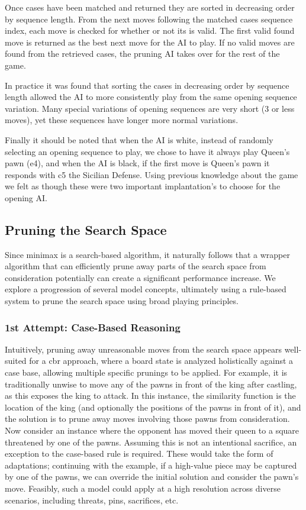 \documentclass[letterpaper]{article}
\begin{document}
Once cases have been matched and returned they are sorted in decreasing order by sequence length. From the next moves following the matched cases sequence index, each move is checked for whether or not its is valid. The first valid found move is returned as the best next move for the AI to play. If no valid moves are found from the retrieved cases, the pruning AI takes over for the rest of the game.

In practice it was found that sorting the cases in decreasing order by sequence length allowed the AI to more consistently play from the same opening sequence variation. Many special variations of opening sequences are very short (3 or less moves), yet these sequences have longer more normal variations.

Finally it should be noted that when the AI is white, instead of randomly selecting an opening sequence to play, we chose to have it always play Queen's pawn (e4), and when the AI is black, if the first move is Queen's pawn it responds with c5 the Sicilian Defense. Using previous knowledge about the game we felt as though these were two important implantation's to choose for the opening AI. 

\subsection{Pruning the Search Space}
Since minimax is a search-based algorithm, it naturally follows that a wrapper algorithm that can efficiently prune away parts of the search space from consideration potentially can create a significant performance increase.  We explore a progression of several model concepts, ultimately using a rule-based system to prune the search space using broad playing principles.

\subsubsection{1st Attempt: Case-Based Reasoning}
Intuitively, pruning away unreasonable moves from the search space appears well-suited for a \acrshort{cbr} approach, where a board state is analyzed holistically against a case base, allowing multiple specific prunings to be applied.  For example, it is traditionally unwise to move any of the pawns in front of the king after castling, as this exposes the king to attack.  In this instance, the similarity function is the location of the king (and optionally the positions of the pawns in front of it), and the solution is to prune away moves involving those pawns from consideration.  Now consider an instance where the opponent has moved their queen to a square threatened by one of the pawns.  Assuming this is not an intentional sacrifice, an exception to the case-based rule is required.  These would take the form of adaptations; continuing with the example, if a high-value piece may be captured by one of the pawns, we can override the initial solution and consider the pawn's move.  Feasibly, such a model could apply at a high resolution across diverse scenarios, including threats, pins, sacrifices, etc.
\end{document}
